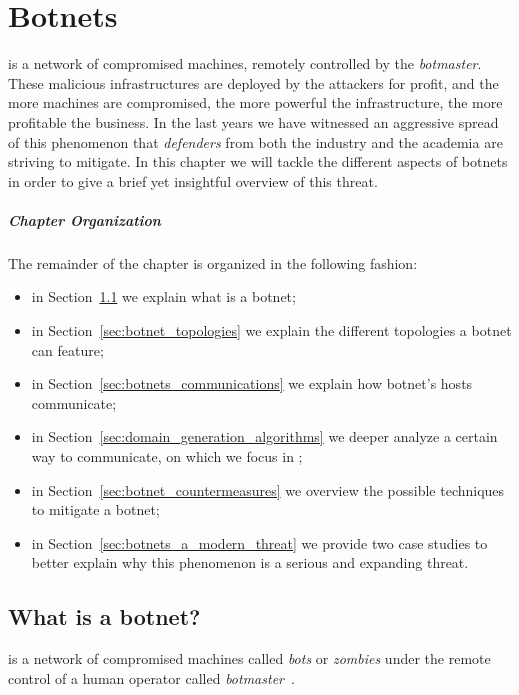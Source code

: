 
\chapter{Botnets} %
\label{chap:botnets}
 is a network of compromised machines, remotely controlled
by the \emph{botmaster}. These malicious infrastructures are deployed by the
attackers for profit, and the more machines are compromised, the more powerful the
infrastructure, the more profitable the business. In the last years we
have witnessed an aggressive spread of this phenomenon that \emph{defenders}
from both the industry and the academia are striving to mitigate. In this
chapter we will tackle the different aspects of botnets in order to give
a brief yet insightful overview of this threat.

\paragraph{Chapter Organization} The remainder of the chapter is organized in
the following fashion:
\begin{itemize}
    \item in Section~\ref{sec:what_is_a_botnet} we explain what is a botnet;
    \item in Section~\ref{sec:botnet_topologies} we explain the different
        topologies a botnet can feature;
    \item in Section~\ref{sec:botnets_communications} we explain how botnet's
        hosts communicate;
    \item in Section~\ref{sec:domain_generation_algorithms} we deeper analyze
        a certain way to communicate, on which we focus in
        \thesystem;
    \item in Section~\ref{sec:botnet_countermeasures} we overview the possible
        techniques to mitigate a botnet;
    \item in Section~\ref{sec:botnets_a_modern_threat} we provide two case
        studies to better  explain why this phenomenon is a serious and expanding
        threat.
\end{itemize}


\newpage

\section{What is a botnet?} %
\label{sec:what_is_a_botnet}
 is a network of compromised machines called \emph{bots}
or \emph{zombies} under the remote control of a human operator called
\emph{botmaster}~\cite{feily2009}.


